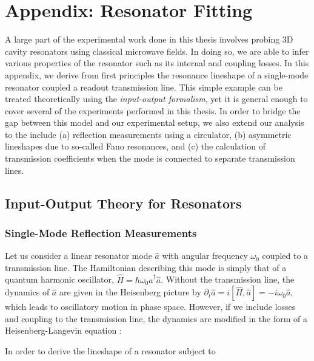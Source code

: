 \appendix
\chapter{Appendix: Resonator Fitting\label{ch:AppA}}

A large part of the experimental work done in this thesis involves probing 3D cavity resonators using classical microwave fields. In doing so, we are able to infer various properties of the resonator such as its internal and coupling losses. In this appendix, we derive from first principles the resonance lineshape of a single-mode resonator coupled a readout transmission line. This simple example can be treated theoretically using the \textit{input-output formalism}, yet it is general enough to cover several of the experiments performed in this thesis. In order to bridge the gap between this model and our experimental setup, we also extend our analysis to the include (a) reflection measurements using a circulator, (b) asymmetric lineshapes due to so-called Fano resonances, and (c) the calculation of transmission coefficients when the mode is connected to separate transmission lines. 

\section{Input-Output Theory for Resonators}
\subsection{Single-Mode Reflection Measurements}

Let us consider a linear resonator mode $\hat{a}$ with angular frequency $\omega_0$ coupled to a transmission line. The Hamiltonian describing this mode is simply that of a quantum harmonic oscillator, $\hat{H} = \hbar\omega_0 \hat{a}^\dagger \hat{a}$. Without the transmission line, the dynamics of $\hat{a}$ are given in the Heisenberg picture by $\partial_t\hat{a} = i[\hat{H}, \hat{a}] = -i\omega_0\hat{a}$, which leads to oscillatory motion in phase space. However, if we include losses and coupling to the transmission line, the dynamics are modified in the form of a Heisenberg-Langevin equation \cite{gardiner1985input, walls1994quantum, gardiner2004quantum, clerk2010introduction}:

In order to derive the lineshape of a resonator subject to  

\subsection{}

